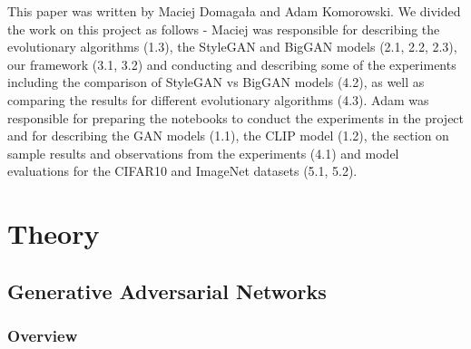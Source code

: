 \documentclass[12pt,a4paper,openany]{book}
\begin{document}
\noindent This paper was written by Maciej Domagała and Adam Komorowski.  We divided the work on this project as follows - Maciej was responsible for describing the evolutionary algorithms (1.3), the StyleGAN and BigGAN models (2.1, 2.2, 2.3),  our framework (3.1, 3.2) and conducting and describing some of the experiments including the comparison of StyleGAN vs BigGAN models (4.2),  as well as comparing the results for different evolutionary algorithms (4.3).  Adam was responsible for preparing the notebooks to conduct the experiments in the project and for describing the GAN models (1.1), the CLIP model (1.2), the section on sample results and observations from the experiments (4.1) and model evaluations for the CIFAR10 and ImageNet datasets (5.1, 5.2).


\chapter{Theory}

\section{Generative Adversarial Networks}


\subsection{Overview}
\end{document}
